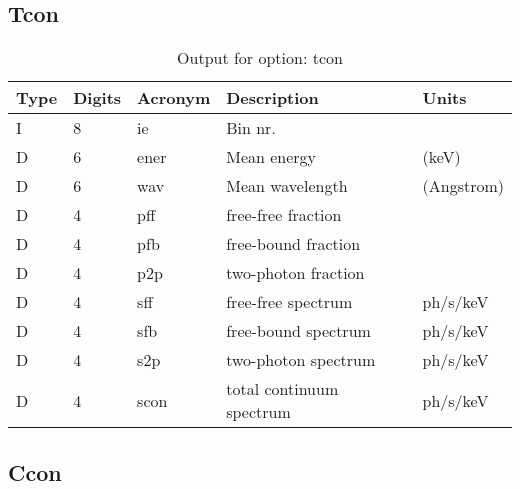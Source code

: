 \subsection{Tcon}

\begin{table}[!p]
\caption{Output for option: tcon}
\label{tabout:tcon}
\begin{tabular}{lllll}
\hline
Type & Digits & Acronym & Description & Units \\ 
\hline
I &  8 & ie   & Bin nr.                          &                  \\
D &  6 & ener & Mean energy                      & (keV)            \\
D &  6 & wav  & Mean wavelength                  & (Angstrom)       \\
D &  4 & pff  & free-free fraction               &                  \\
D &  4 & pfb  & free-bound fraction              &                  \\
D &  4 & p2p  & two-photon fraction              &                  \\
D &  4 & sff  & free-free spectrum               & ph/s/keV         \\
D &  4 & sfb  & free-bound spectrum              & ph/s/keV         \\
D &  4 & s2p  & two-photon spectrum              & ph/s/keV         \\
D &  4 & scon & total continuum spectrum         & ph/s/keV         \\
\hline
\end{tabular}
\end{table}

\subsection{Ccon}

